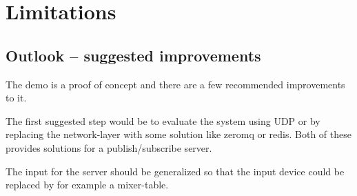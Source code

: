 \section{Limitations}

\subsection*{Outlook -- suggested improvements}
The demo is a proof of concept and there are a few recommended improvements to it. 

The first suggested step would be to evaluate the system using UDP or by replacing the network-layer with some solution like zeromq or redis. Both of these provides solutions for a publish/subscribe server. 

The input for the server should be generalized so that the input device could be replaced by for example a mixer-table. 

